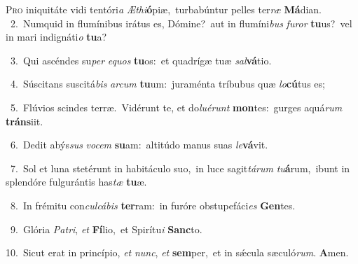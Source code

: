\lettrine{\initial\textcolor{\initialcolor}{P}}{ro} iniquitáte vidi tentóri\textit{a} \textit{Æ}\-\textit{thi}\textbf{ó}piæ,~\star turbabúntur pelles ter\textit{ræ} \textbf{Má}\-dian.\\
{\numbfont\textcolor{\numbcolor}{~2.}}~Numquid in flumínibus irátus es, Dómine?~\dagger aut in flumíni\textit{bus} \textit{fu}\-\textit{ror} \textbf{tu}\-us?~\star vel in mari indignáti\textit{o} \textbf{tu}\-a?\par
{\numbfont\textcolor{\numbcolor}{~3.}}~Qui ascéndes su\textit{per} \textit{e}\-\textit{quos} \textbf{tu}\-os:~\star et quadrígæ tuæ \textit{sal}\-\textbf{vá}tio.\par
{\numbfont\textcolor{\numbcolor}{~4.}}~Súscitans suscitá\textit{bis} \textit{ar}\-\textit{cum} \textbf{tu}\-um:~\star juraménta tríbubus quæ \textit{lo}\-\textbf{cú}tus es;\par
{\numbfont\textcolor{\numbcolor}{~5.}}~Flúvios scindes terræ.~\dagger Vidérunt te, et do\-\textit{lu}\-\textit{é}\textit{runt} \textbf{mon}\-tes:~\star gurges aquá\textit{rum} \textbf{tráns}\-iit.\par
{\numbfont\textcolor{\numbcolor}{~6.}}~Dedit abýs\textit{sus} \textit{vo}\-\textit{cem} \textbf{su}\-am:~\star altitúdo manus suas \textit{le}\-\textbf{vá}vit.\par
{\numbfont\textcolor{\numbcolor}{~7.}}~Sol et luna stetérunt in habitáculo suo,~\dagger in luce sagit\-\textit{tá}\-\textit{rum} \textit{tu}\-\textbf{á}rum,~\star ibunt in splendóre fulgurántis has\textit{tæ} \textbf{tu}\-æ.\par
{\numbfont\textcolor{\numbcolor}{~8.}}~In frémitu con\-\textit{cul}\-\textit{cá}\textit{bis} \textbf{ter}\-ram:~\star in furóre obstupefáci\textit{es} \textbf{Gen}\-tes.\par
{\numbfont\textcolor{\numbcolor}{~9.}}~Glória \textit{Pa}\-\textit{tri}, \textit{et} \textbf{Fí}\-lio,~\star et Spirítu\textit{i} \textbf{Sanc}\-to.\par
{\numbfont\textcolor{\numbcolor}{10.}}~Sicut erat in princípio, \textit{et} \textit{nunc}\-, \textit{et} \textbf{sem}\-per,~\star et in sǽcula sæculó\-\textit{rum}\-. \textbf{A}\-men.\par
